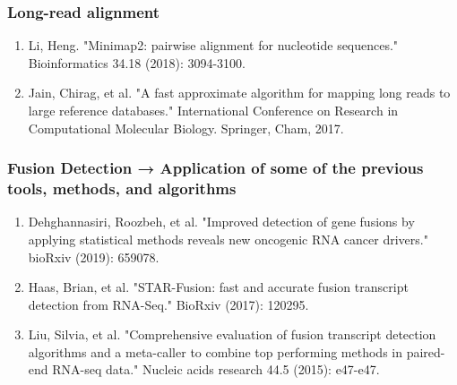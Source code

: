 \subsubsection{Long-read alignment}
\begin{enumerate}
    \item Li, Heng. "Minimap2: pairwise alignment for nucleotide sequences." Bioinformatics 34.18 (2018): 3094-3100.
    \item Jain, Chirag, et al. "A fast approximate algorithm for mapping long reads to large reference databases." International Conference on Research in Computational Molecular Biology. Springer, Cham, 2017.
\end{enumerate}
\subsubsection{Fusion Detection → Application of some of the previous tools, methods, and algorithms}
\begin{enumerate}
    \item Dehghannasiri, Roozbeh, et al. "Improved detection of gene fusions by applying statistical methods reveals new oncogenic RNA cancer drivers." bioRxiv (2019): 659078.
    \item Haas, Brian, et al. "STAR-Fusion: fast and accurate fusion transcript detection from RNA-Seq." BioRxiv (2017): 120295.
    \item Liu, Silvia, et al. "Comprehensive evaluation of fusion transcript detection algorithms and a meta-caller to combine top performing methods in paired-end RNA-seq data." Nucleic acids research 44.5 (2015): e47-e47.
\end{enumerate}



